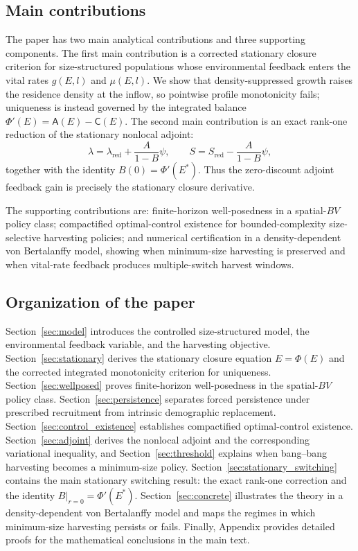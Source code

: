 \documentclass[pdflatex,sn-mathphys-num]{sn-jnl}
\theoremstyle{plain}
\theoremstyle{definition}
\theoremstyle{remark}
\begin{document}
\subsection{Main contributions}
\label{subsec:main_contributions}

The paper has two main analytical contributions and three supporting
components. The first main contribution is a corrected stationary closure
criterion for size-structured populations whose environmental feedback enters
the vital rates \(g(E,l)\) and \(\mu(E,l)\). We show that density-suppressed growth
raises the residence density at the inflow, so pointwise profile monotonicity
fails; uniqueness is instead governed by the integrated balance
$\displaystyle \Phi'(E)=\mathsf A(E)-\mathsf C(E)$.
The second main contribution is an exact rank-one reduction of the stationary
nonlocal adjoint:
\[
\lambda=\lambda_{\mathrm{red}}+\frac{A}{1-B}\psi,
\qquad
S=S_{\mathrm{red}}-\frac{A}{1-B}\psi,
\]
together with the identity
$\displaystyle B(0)=\Phi'(E^*)$.
Thus the zero-discount adjoint feedback gain is precisely the stationary closure
derivative.

The supporting contributions are: finite-horizon well-posedness in a spatial-\(BV\)
policy class; compactified optimal-control existence for bounded-complexity
size-selective harvesting policies; and numerical certification in a
density-dependent von Bertalanffy model, showing when minimum-size harvesting is
preserved and when vital-rate feedback produces multiple-switch harvest windows.

\subsection{Organization of the paper}
\label{subsec:organization}

Section~\ref{sec:model} introduces the controlled size-structured model, the
environmental feedback variable, and the harvesting objective. 
Section~\ref{sec:stationary} derives the stationary closure equation
$E=\Phi(E)$ and the corrected integrated monotonicity criterion for uniqueness.
Section~\ref{sec:wellposed} proves finite-horizon well-posedness in the
spatial-$BV$ policy class. Section~\ref{sec:persistence} separates forced
persistence under prescribed recruitment from intrinsic demographic replacement.
Section~\ref{sec:control_existence} establishes compactified optimal-control
existence. Section~\ref{sec:adjoint} derives the nonlocal adjoint and the
corresponding variational inequality, and Section~\ref{sec:threshold} explains
when bang--bang harvesting becomes a minimum-size policy. 
Section~\ref{sec:stationary_switching} contains the main stationary switching
result: the exact rank-one correction and the identity
$B|_{r=0}=\Phi'(E^*)$. Section~\ref{sec:concrete} illustrates the theory
in a density-dependent von Bertalanffy model and maps the regimes in which
minimum-size harvesting persists or fails.
Finally, Appendix provides detailed proofs for the mathematical conclusions in the main text.
\end{document}
